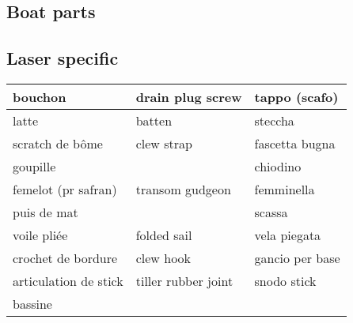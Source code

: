 \documentclass[a4paper, 12pt, twoside]{article}
\begin{document}
\begin{indt}{\section{Boat parts}}
\begin{indt}{\subsection{Laser specific}}
\begin{tabular}{|l|l|l|}
                \hline %
                bouchon %
                & drain plug screw
                & tappo (scafo)
                \\
                \hline %
                latte %
                & batten
                & steccha
                \\
                \hline %
                scratch de bôme %
                & clew strap
                & fascetta bugna
                \\
                \hline %
                goupille %
                &
                & chiodino
                \\
                \hline %
                femelot (pr safran) %
                & transom gudgeon
                & femminella
                \\
                \hline %
                puis de mat %
                &
                & scassa
                \\
                \hline %
                voile pliée %
                & folded sail
                & vela piegata
                \\
                \hline %
                crochet de bordure %
                & clew hook
                & gancio per base
                \\
                \hline %
                articulation de stick %
                & tiller rubber joint
                & snodo stick
                \\
                \hline %
                bassine %
                &
                &
                \\
                \hline %
            \end{tabular}
        \end{indt} %


\end{indt}
\end{document}
